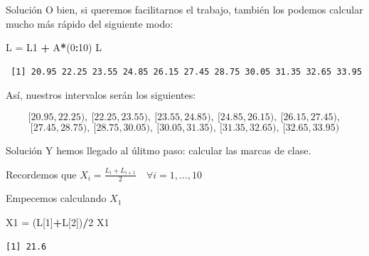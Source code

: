 \documentclass[
  ignorenonframetext,
]{beamer}
\newenvironment{Shaded}{\begin{snugshade}}{\end{snugshade}}
\newcommand{\DecValTok}[1]{\textcolor[rgb]{0.00,0.00,0.81}{#1}}
\newcommand{\NormalTok}[1]{#1}
\newcommand{\OtherTok}[1]{\textcolor[rgb]{0.56,0.35,0.01}{#1}}
\newcommand{\SpecialCharTok}[1]{\textcolor[rgb]{0.81,0.36,0.00}{\textbf{#1}}}
\begin{document}
\begin{frame}[fragile]{Solución}
\label{soluciuxf3n-7}
O bien, si queremos facilitarnos el trabajo, también los podemos
calcular mucho más rápido del siguiente modo:

\begin{Shaded}
\begin{Highlighting}[]
\NormalTok{L }\OtherTok{=}\NormalTok{ L1 }\SpecialCharTok{+}\NormalTok{ A}\SpecialCharTok{*}\NormalTok{(}\DecValTok{0}\SpecialCharTok{:}\DecValTok{10}\NormalTok{)}
\NormalTok{L}
\end{Highlighting}
\end{Shaded}

\begin{verbatim}
 [1] 20.95 22.25 23.55 24.85 26.15 27.45 28.75 30.05 31.35 32.65 33.95
\end{verbatim}

Así, nuestros intervalos serán los siguientes:

\[[20.95,22.25),\ [22.25,23.55),\ [23.55,24.85),\ [24.85,26.15),\ [26.15,27.45),\]
\[[27.45,28.75),\ [28.75,30.05),\ [30.05,31.35),\ [31.35,32.65),\ [32.65,33.95)\]
\end{frame}

\begin{frame}[fragile]{Solución}
\label{soluciuxf3n-8}
Y hemos llegado al úlitmo paso: calcular las marcas de clase.

Recordemos que
\(X_i = \frac{L_{i}+L_{i+1}}{2} \quad\forall i=1,\dots,10\)

Empecemos calculando \(X_1\)

\begin{Shaded}
\begin{Highlighting}[]
\NormalTok{X1 }\OtherTok{=}\NormalTok{ (L[}\DecValTok{1}\NormalTok{]}\SpecialCharTok{+}\NormalTok{L[}\DecValTok{2}\NormalTok{])}\SpecialCharTok{/}\DecValTok{2}
\NormalTok{X1}
\end{Highlighting}
\end{Shaded}

\begin{verbatim}
[1] 21.6
\end{verbatim}
\end{frame}
\end{document}
